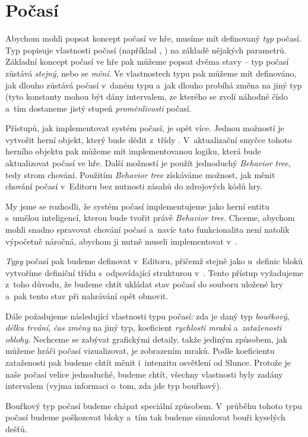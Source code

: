 
\section{Počasí}

Abychom mohli popsat koncept počasí ve hře, musíme mít definovaný \textit{typ} počasí. Typ popisuje vlastnosti počasí (například , ) na základě nějakých parametrů. Základní koncept počasí ve hře pak můžeme popsat dvěma stavy -- typ počasí zůstává \textit{stejný}, nebo se \textit{mění}. Ve vlastnostech typu pak můžeme mít definováno, jak dlouho zůstává počasí v~daném typu a~jak dlouho probíhá změna na jiný typ (tyto konstanty mohou být dány intervalem, ze kterého se zvolí náhodné číslo a~tím dostaneme jistý stupeň \textit{proměnlivosti} počasí.

Přístupů, jak implementovat systém počasí, je opět více. Jednou možností je vytvořit herní objekt, který bude dědit z~třídy . V~aktualizační smyčce tohoto herního objektu pak můžeme mít implementovanou logiku, která bude aktualizovat počasí ve hře. Další možností je použít jednoduchý \textit{Behavior tree}, tedy strom chování. Použitím \textit{Behavior tree} získáváme možnost, jak měnit chování počasí v~Editoru bez nutnosti zásahů do zdrojových kódů hry. 

My jsme se rozhodli, že systém počasí implementujeme jako herní entitu s~umělou inteligencí, kterou bude tvořit právě \textit{Behavior tree}. Chceme, abychom mohli snadno spravovat chování počasí a~navíc tato funkcionalita není natolik výpočetně náročná, abychom ji nutně museli implementovat v~\CPP{}.

\textit{Typy} počasí pak budeme definovat v~Editoru, přičemž stejně jako u~definic bloků vytvoříme definiční třídu s~odpovídající strukturou v~\CPP{}. Tento přístup vyžadujeme z~toho důvodu, že budeme chtít ukládat stav počasí do souboru uložené hry a~pak tento stav při nahrávání opět obnovit. 

Dále požadujeme následující vlastnosti typu počasí: zda je daný typ \textit{bouřkový}, \textit{délku trvání}, \textit{čas změny} na jiný typ, koeficient \textit{rychlosti mraků} a~\textit{zataženosti oblohy}. Nechceme se zabývat grafickými detaily, takže jediným způsobem, jak můžeme hráči počasí vizualizovat, je zobrazením mraků. Podle koeficientu zataženosti pak budeme chtít měnit i~intenzitu osvětlení od Slunce. Protože je naše počasí velice jednoduché, budeme chtít, všechny vlastnosti byly zadány intervalem (vyjma informaci o~tom, zda jde typ bouřkový).

Bouřkový typ počasí budeme chápat speciální způsobem. V~průběhu tohoto typu počasí budeme poškozovat bloky a~tím tak budeme simulovat bouři kyselých dešťů. 